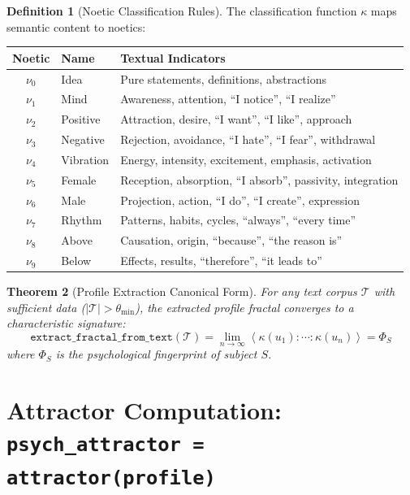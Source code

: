 \documentclass[11pt,twoside]{book}
\newcommand{\noe}[1]{\nu_{#1}}
\newcommand{\ProfileFrac}{\Phi}
\newcommand{\TextCorpus}{\mathcal{T}}
\theoremstyle{definition}
\newtheorem{definition}{Definition}[chapter]
\theoremstyle{plain}
\newtheorem{theorem}[definition]{Theorem}
\theoremstyle{remark}
\begin{document}
\begin{definition}[Noetic Classification Rules]
The classification function $\kappa$ maps semantic content to noetics:

\begin{center}
\footnotesize
\begin{tabularx}{\textwidth}{c|l|X}
\toprule
\textbf{Noetic} & \textbf{Name} & \textbf{Textual Indicators} \\
\midrule
$\noe{0}$ & Idea & Pure statements, definitions, abstractions \\
$\noe{1}$ & Mind & Awareness, attention, ``I notice'', ``I realize'' \\
$\noe{2}$ & Positive & Attraction, desire, ``I want'', ``I like'', approach \\
$\noe{3}$ & Negative & Rejection, avoidance, ``I hate'', ``I fear'', withdrawal \\
$\noe{4}$ & Vibration & Energy, intensity, excitement, emphasis, activation \\
$\noe{5}$ & Female & Reception, absorption, ``I absorb'', passivity, integration \\
$\noe{6}$ & Male & Projection, action, ``I do'', ``I create'', expression \\
$\noe{7}$ & Rhythm & Patterns, habits, cycles, ``always'', ``every time'' \\
$\noe{8}$ & Above & Causation, origin, ``because'', ``the reason is'' \\
$\noe{9}$ & Below & Effects, results, ``therefore'', ``it leads to'' \\
\bottomrule
\end{tabularx}
\end{center}
\end{definition}

\begin{theorem}[Profile Extraction Canonical Form]
For any text corpus $\TextCorpus$ with sufficient data ($|\TextCorpus| > \theta_{\min}$), the extracted profile fractal converges to a characteristic signature:
\begin{equation}
\boxed{
    \texttt{extract\_fractal\_from\_text}(\TextCorpus) =
    \lim_{n \to \infty} \left\langle \kappa(u_1) : \cdots : \kappa(u_n) \right\rangle
    = \ProfileFrac_S
}
\end{equation}
where $\ProfileFrac_S$ is the \emph{psychological fingerprint} of subject $S$.
\end{theorem}

\section{Attractor Computation: \texttt{psych\_attractor = attractor(profile)}}
\end{document}
